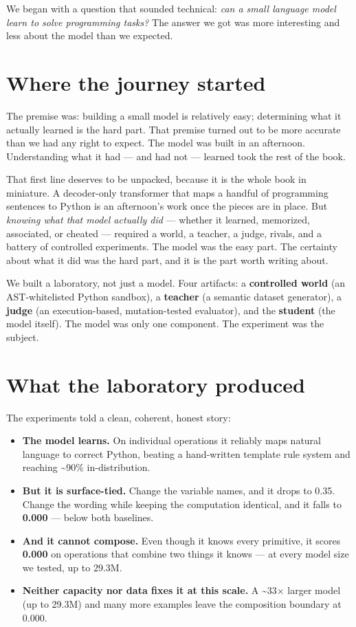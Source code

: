 We began with a question that sounded technical: \emph{can a small
language model learn to solve programming tasks?} The answer we got was
more interesting and less about the model than we expected.

\section{Where the journey started}\label{where-the-journey-started}

The premise was: building a small model is relatively easy; determining
what it actually learned is the hard part. That premise turned out to be
more accurate than we had any right to expect. The model was built in an
afternoon. Understanding what it had --- and had not --- learned took
the rest of the book.

That first line deserves to be unpacked, because it is the whole book in
miniature. A decoder-only transformer that maps a handful of programming
sentences to Python is an afternoon's work once the pieces are in place.
But \emph{knowing what that model actually did} --- whether it learned,
memorized, associated, or cheated --- required a world, a teacher, a
judge, rivals, and a battery of controlled experiments. The model was
the easy part. The certainty about what it did was the hard part, and it
is the part worth writing about.

We built a laboratory, not just a model. Four artifacts: a
\textbf{controlled world} (an AST-whitelisted Python sandbox), a
\textbf{teacher} (a semantic dataset generator), a \textbf{judge} (an
execution-based, mutation-tested evaluator), and the \textbf{student}
(the model itself). The model was only one component. The experiment was
the subject.

\section{What the laboratory
produced}\label{what-the-laboratory-produced}

The experiments told a clean, coherent, honest story:

\begin{itemize}
\tightlist
\item
  \textbf{The model learns.} On individual operations it reliably maps
  natural language to correct Python, beating a hand-written template
  rule system and reaching \textasciitilde90\% in-distribution.
\item
  \textbf{But it is surface-tied.} Change the variable names, and it
  drops to 0.35. Change the wording while keeping the computation
  identical, and it falls to \textbf{0.000} --- below both baselines.
\item
  \textbf{And it cannot compose.} Even though it knows every primitive,
  it scores \textbf{0.000} on operations that combine two things it
  knows --- at every model size we tested, up to 29.3M.
\item
  \textbf{Neither capacity nor data fixes it at this scale.} A
  \textasciitilde33× larger model (up to 29.3M) and many more examples
  leave the composition boundary at 0.000.
\end{itemize}

